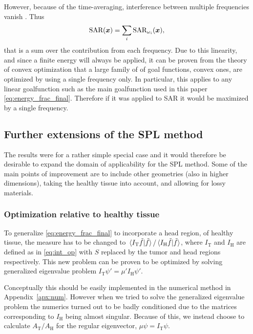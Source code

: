 \documentclass[11pt,a4paper, 
swedish,english %
]{article}
\newcommand{\tf}{\ensuremath{\tilde{f}}}
\begin{document}
However, because of the time-averaging, interference between multiple
frequencies vanish \cite{Martinsson}. Thus
\begin{equation}
\text{SAR}(\vb*x)=\sum_i\text{SAR}_{\omega_i}(\vb*x),
\end{equation}
that is a sum over the contribution from each frequency.
Due to this linearity, and since a finite energy will always be
applied, it can be proven from the theory of convex optimization
that a large family of of goal functions, convex ones, are optimized
by using a single frequency only. In particular, this applies to any
linear goalfunction such as the main goalfunction used in this paper 
\eqref{eq:energy_frac_final}. Therefore if it was applied to SAR it
would be maximized by a single frequency.   



\subsection{Further extensions of the SPL method}
The results were for a rather simple special case and it would
therefore be desirable to expand the domain of applicability for the
SPL method. Some of the main points of improvement are to include other 
geometries (also in higher dimensions), taking the healthy
tissue into account, and allowing for lossy materials.

\subsubsection{Optimization relative to healthy tissue}
To generalize \eqref{eq:energy_frac_final} to
incorporate a head region, of healthy tissue, the measure has to
be changed to $\ip*{I_\text{T}\tf}{\tf}/\ip*{I_\text{H}\tf}{\tf}$, where 
$I_\text{T}$ and $I_\text{H}$ are defined as in \eqref{eq:int_op} with
$S$ replaced by the tumor and head regions respectively. 
This new problem can be proven to be optimized by solving
generalized eigenvalue problem $I_\text{T}\psi'=\mu'I_\text{H}\psi'$.

Conceptually this should be easily implemented in the numerical method
in Appendix~\ref{apx:num}. However when we tried to solve the
generalized eigenvalue problem the numerics turned out to be badly
conditioned due to the matrices corresponding to $I_\text{H}$ being
almost singular. Because of this, we instead choose to calculate
$A_\text{T}/A_\text{H}$ for the regular eigenvector,
$\mu\psi=I_\text{T}\psi$. 
\end{document}

